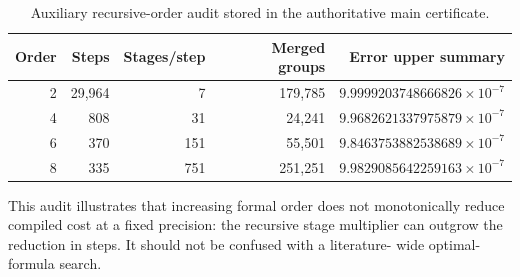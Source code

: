 \begin{table}[t]
\centering
\caption{Auxiliary recursive-order audit stored in the authoritative main
certificate.}
\label{tab:recursive-audit}
\begin{tabular}{@{}rrrrr@{}}
\toprule
Order & Steps & Stages/step & Merged groups & Error upper summary \\
\midrule
2 & 29,964 & 7 & 179,785 & $9.9999203748666826\times10^{-7}$ \\
4 & 808 & 31 & 24,241 & $9.9682621337975879\times10^{-7}$ \\
6 & 370 & 151 & 55,501 & $9.8463753882538689\times10^{-7}$ \\
8 & 335 & 751 & 251,251 & $9.9829085642259163\times10^{-7}$ \\
\bottomrule
\end{tabular}
\end{table}

This audit illustrates that increasing formal order does not monotonically
reduce compiled cost at a fixed precision: the recursive stage multiplier can
outgrow the reduction in steps.  It should not be confused with a literature-
wide optimal-formula search.
